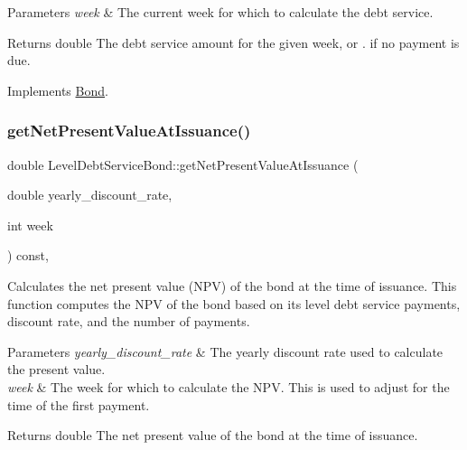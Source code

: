 \begin{DoxyParams}{Parameters}
{\em week} & The current week for which to calculate the debt service.\\
\hline
\end{DoxyParams}
\begin{DoxyReturn}{Returns}
double The debt service amount for the given week, or {.} if no payment is due. 
\end{DoxyReturn}


Implements \mbox{\hyperlink{classBond_a98d8ecaf4b36319674ebd220598996bc}{Bond}}.

\mbox{\label{classLevelDebtServiceBond_a0f5820c3e76b8b908dbe153a8291d96a}} 
\subsubsection{\texorpdfstring{get\+Net\+Present\+Value\+At\+Issuance()}{getNetPresentValueAtIssuance()}}
{\footnotesize\ttfamily double Level\+Debt\+Service\+Bond\+::get\+Net\+Present\+Value\+At\+Issuance (\begin{DoxyParamCaption}\item[{double}]{yearly\+\_\+discount\+\_\+rate,  }\item[{int}]{week }\end{DoxyParamCaption}) const\hspace{0.3cm}{\ttfamily [override]}, {\ttfamily [virtual]}}



Calculates the net present value (N\+PV) of the bond at the time of issuance. This function computes the N\+PV of the bond based on its level debt service payments, discount rate, and the number of payments. 


\begin{DoxyParams}{Parameters}
{\em yearly\+\_\+discount\+\_\+rate} & The yearly discount rate used to calculate the present value. \\
\hline
{\em week} & The week for which to calculate the N\+PV. This is used to adjust for the time of the first payment.\\
\hline
\end{DoxyParams}
\begin{DoxyReturn}{Returns}
double The net present value of the bond at the time of issuance.
\end{DoxyReturn}

